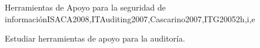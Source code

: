 \begin{syllabus}
\begin{unit}{Herramientas de Apoyo para la seguridad de información}{}{ISACA2008,ITAuditing2007,Cascarino2007,ITG2005}{2}{h,i,e}
    \begin{learningoutcomes}
    \item Estudiar herramientas de apoyo para la auditoría.
    \end{learningoutcomes}
    \end{unit}
    
    \begin{coursebibliography}
    \end{coursebibliography}
    
    \end{syllabus}
    